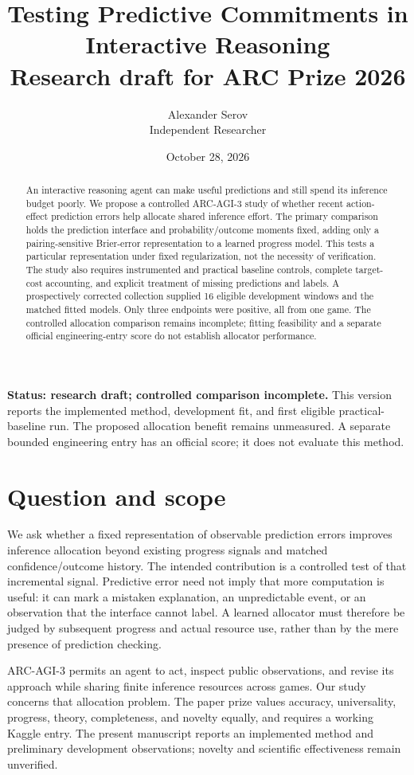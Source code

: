 \documentclass[11pt]{article}
\title{Testing Predictive Commitments in Interactive Reasoning\\\large Research draft for ARC Prize 2026}
\author{Alexander Serov\\Independent Researcher}
\date{October 28, 2026}
\begin{document}
\maketitle
\noindent\textbf{Status: research draft; controlled comparison incomplete.}
This version reports the implemented method, development fit, and first eligible practical-baseline run. The proposed allocation benefit remains unmeasured. A separate bounded engineering entry has an official score; it does not evaluate this method.

\begin{abstract}
An interactive reasoning agent can make useful predictions and still spend its inference budget poorly. We propose a controlled ARC-AGI-3 study of whether recent action-effect prediction errors help allocate shared inference effort. The primary comparison holds the prediction interface and probability/outcome moments fixed, adding only a pairing-sensitive Brier-error representation to a learned progress model. This tests a particular representation under fixed regularization, not the necessity of verification. The study also requires instrumented and practical baseline controls, complete target-cost accounting, and explicit treatment of missing predictions and labels. A prospectively corrected collection supplied 16 eligible development windows and the matched fitted models. Only three endpoints were positive, all from one game. The controlled allocation comparison remains incomplete; fitting feasibility and a separate official engineering-entry score do not establish allocator performance.
\end{abstract}

\section{Question and scope}
We ask whether a fixed representation of observable prediction errors improves inference allocation beyond existing progress signals and matched confidence/outcome history. The intended contribution is a controlled test of that incremental signal. Predictive error need not imply that more computation is useful: it can mark a mistaken explanation, an unpredictable event, or an observation that the interface cannot label. A learned allocator must therefore be judged by subsequent progress and actual resource use, rather than by the mere presence of prediction checking.

ARC-AGI-3 permits an agent to act, inspect public observations, and revise its approach while sharing finite inference resources across games. Our study concerns that allocation problem. The paper prize values accuracy, universality, progress, theory, completeness, and novelty equally, and requires a working Kaggle entry\cite{arc2026}. The present manuscript reports an implemented method and preliminary development observations; novelty and scientific effectiveness remain unverified.
\end{document}
